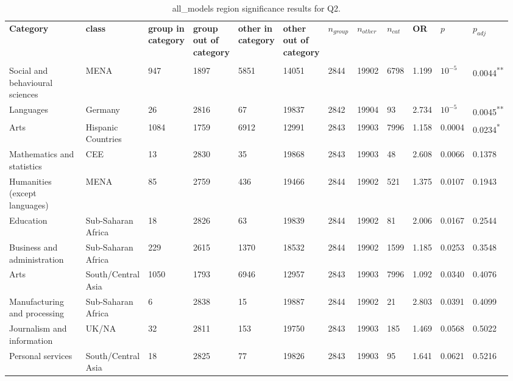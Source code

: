 \clearpage
\begin{landscape}
\begin{table}[p]
\centering
\caption{all_models region significance results for Q2.}
\label{tab:appendix-q2-all_models-region}
\scriptsize
\renewcommand{\arraystretch}{0.92}
\setlength{\tabcolsep}{2pt}
\begin{tabular}{p{0.35\linewidth}p{0.1\linewidth}p{0.05\linewidth}p{0.05\linewidth}p{0.05\linewidth}p{0.05\linewidth}p{0.05\linewidth}p{0.05\linewidth}p{0.05\linewidth}p{0.05\linewidth}p{0.05\linewidth}p{0.06\linewidth}}
\toprule
\textbf{Category} & \textbf{class} & \textbf{group in category} & \textbf{group out of category} & \textbf{other in category} & \textbf{other out of category} & \textbf{$n_{group}$} & \textbf{$n_{other}$} & \textbf{$n_{cat}$} & \textbf{OR} & \textbf{$p$} & \textbf{$p_{adj}$} \\\\
\midrule
Social and behavioural sciences & MENA & 947 & 1897 & 5851 & 14051 & 2844 & 19902 & 6798 & 1.199 & $10^{-5}$ & 0.0044\textsuperscript{**} \\
Languages & Germany & 26 & 2816 & 67 & 19837 & 2842 & 19904 & 93 & 2.734 & $10^{-5}$ & 0.0045\textsuperscript{**} \\
Arts & Hispanic Countries & 1084 & 1759 & 6912 & 12991 & 2843 & 19903 & 7996 & 1.158 & 0.0004 & 0.0234\textsuperscript{*} \\
Mathematics and statistics & CEE & 13 & 2830 & 35 & 19868 & 2843 & 19903 & 48 & 2.608 & 0.0066 & 0.1378 \\
Humanities (except languages) & MENA & 85 & 2759 & 436 & 19466 & 2844 & 19902 & 521 & 1.375 & 0.0107 & 0.1943 \\
Education & Sub-Saharan Africa & 18 & 2826 & 63 & 19839 & 2844 & 19902 & 81 & 2.006 & 0.0167 & 0.2544 \\
Business and administration & Sub-Saharan Africa & 229 & 2615 & 1370 & 18532 & 2844 & 19902 & 1599 & 1.185 & 0.0253 & 0.3548 \\
Arts & South/Central Asia & 1050 & 1793 & 6946 & 12957 & 2843 & 19903 & 7996 & 1.092 & 0.0340 & 0.4076 \\
Manufacturing and processing & Sub-Saharan Africa & 6 & 2838 & 15 & 19887 & 2844 & 19902 & 21 & 2.803 & 0.0391 & 0.4099 \\
Journalism and information & UK/NA & 32 & 2811 & 153 & 19750 & 2843 & 19903 & 185 & 1.469 & 0.0568 & 0.5022 \\
Personal services & South/Central Asia & 18 & 2825 & 77 & 19826 & 2843 & 19903 & 95 & 1.641 & 0.0621 & 0.5216 \\

\end{tabular}
\end{table}
\end{landscape}
